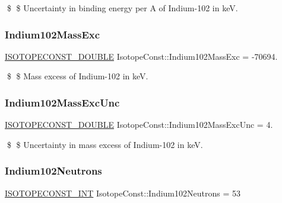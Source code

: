 \$ \$ Uncertainty in binding energy per A of Indium-\/102 in keV. \mbox{\label{group___isotope_const-_indium-_in102_gabbe2994d2966f676fbd03e0d17d2e913}} 
\subsubsection{\texorpdfstring{Indium102\+Mass\+Exc}{Indium102MassExc}}
{\footnotesize\ttfamily \mbox{\hyperlink{group___isotope_const-_macros_ga8f45a7272ce02c0b4c65c44636ed719a}{I\+S\+O\+T\+O\+P\+E\+C\+O\+N\+S\+T\+\_\+\+D\+O\+U\+B\+LE}} Isotope\+Const\+::\+Indium102\+Mass\+Exc = -\/70694.}

\$ \$ Mass excess of Indium-\/102 in keV. \mbox{\label{group___isotope_const-_indium-_in102_ga4dd6a569150ace239c6c51c09d417f5b}} 
\subsubsection{\texorpdfstring{Indium102\+Mass\+Exc\+Unc}{Indium102MassExcUnc}}
{\footnotesize\ttfamily \mbox{\hyperlink{group___isotope_const-_macros_ga8f45a7272ce02c0b4c65c44636ed719a}{I\+S\+O\+T\+O\+P\+E\+C\+O\+N\+S\+T\+\_\+\+D\+O\+U\+B\+LE}} Isotope\+Const\+::\+Indium102\+Mass\+Exc\+Unc = 4.}

\$ \$ Uncertainty in mass excess of Indium-\/102 in keV. \mbox{\label{group___isotope_const-_indium-_in102_ga37ee5af598c30623ef7e8d4f6c87bb5d}} 
\subsubsection{\texorpdfstring{Indium102\+Neutrons}{Indium102Neutrons}}
{\footnotesize\ttfamily \mbox{\hyperlink{group___isotope_const-_macros_ga5f18360b3e99483a35c32d789e62621c}{I\+S\+O\+T\+O\+P\+E\+C\+O\+N\+S\+T\+\_\+\+I\+NT}} Isotope\+Const\+::\+Indium102\+Neutrons = 53}

